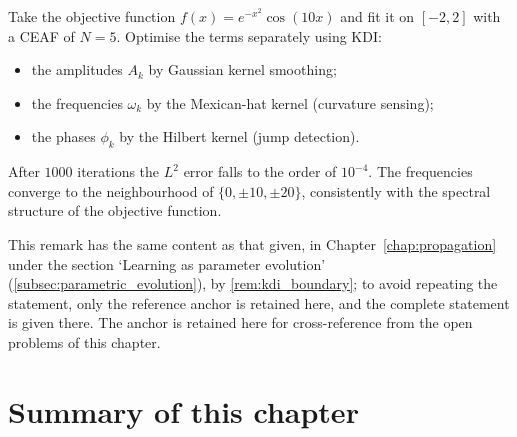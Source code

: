 \begin{example}\label{ex:kdi_ceaf}
Take the objective function $f(x) = e^{-x^2}\cos(10x)$ and fit it on $[-2,2]$ with a CEAF of $N=5$. Optimise the terms separately using KDI:
\begin{itemize}
    \item the amplitudes $A_k$ by Gaussian kernel smoothing;
    \item the frequencies $\omega_k$ by the Mexican-hat kernel (curvature sensing);
    \item the phases $\phi_k$ by the Hilbert kernel (jump detection).
\end{itemize}
After $1000$ iterations the $L^2$ error falls to the order of $10^{-4}$. The frequencies converge to the neighbourhood of $\{0,\pm 10,\pm 20\}$, consistently with the spectral structure of the objective function.
\end{example}

\begin{remark}\label{rem:kdi-open}
This remark has the same content as that given, in Chapter~\ref{chap:propagation} under the section `Learning as parameter evolution' (\cref{subsec:parametric_evolution}), by \cref{rem:kdi_boundary}; to avoid repeating the statement, only the reference anchor is retained here, and the complete statement is given there. The anchor is retained here for cross-reference from the open problems of this chapter.
\end{remark}

\section{Summary of this chapter}\label{sec:ps_summary}

